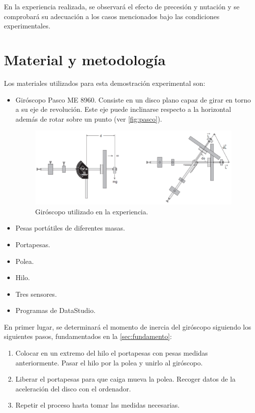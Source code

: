 \documentclass[a4paper]{article}
\begin{document}
En la experiencia realizada, se observará el efecto de precesión y nutación y se comprobará su adecuación a los casos mencionados bajo las condiciones experimentales.

\section{Material y metodología} \label{sec:metodo}

Los materiales utilizados para esta demostración experimental son:
\begin{itemize}
\item Giróscopo Pasco ME 8960. Consiste en un disco plano capaz de girar en torno a su eje de revolución. Este eje puede inclinarse respecto a la horizontal además de rotar sobre un punto (ver \autoref{fig:pasco}).
\begin{figure}[h]
\begin{center}
\includegraphics[width=12cm]{disco2.png}
\caption{Giróscopo utilizado en la experiencia.}
\label{fig:pasco}
\end{center}
\end{figure}
\item Pesas portátiles de diferentes masas.
\item Portapesas.
\item Polea.
\item Hilo.
\item Tres sensores.
\item Programas de DataStudio.
\end{itemize}
En primer lugar, se determinará el momento de inercia del giróscopo siguiendo los siguientes pasos, fundamentados en la \autoref{sec:fundamento}:
\begin{enumerate}
\item Colocar en un extremo del hilo el portapesas con pesas medidas anteriormente. Pasar el hilo por la polea y unirlo al giróscopo.
\item Liberar el portapesas para que caiga mueva la polea. Recoger datos de la aceleración del disco con el ordenador. 
\item Repetir el proceso hasta tomar las medidas necesarias.
\end{enumerate}
\end{document}
